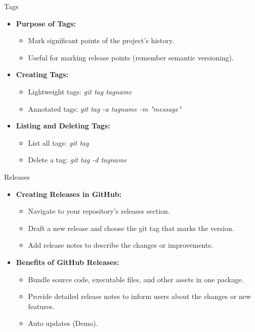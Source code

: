\documentclass[aspectratio=169]{beamer}
\begin{document}
\begin{frame}{Tags}
\begin{itemize}
    \item \textbf{Purpose of Tags:}
    \begin{itemize}
        \item Mark significant points of the project's history.
        \item Useful for marking release points (remember semantic versioning).
    \end{itemize}
    \item \textbf{Creating Tags:}
    \begin{itemize}
        \item Lightweight tags: \textit{git tag tagname}
        \item Annotated tags: \textit{git tag -a tagname -m "message"}
    \end{itemize}
    \item \textbf{Listing and Deleting Tags:}
    \begin{itemize}
        \item List all tags: \textit{git tag}
        \item Delete a tag: \textit{git tag -d tagname}
    \end{itemize}
\end{itemize}
\end{frame}
\begin{frame}{Releases}
\begin{itemize}
    \item \textbf{Creating Releases in GitHub:}
    \begin{itemize}
        \item Navigate to your repository's releases section.
        \item Draft a new release and choose the git tag that marks the version.
        \item Add release notes to describe the changes or improvements.
    \end{itemize}
    \item \textbf{Benefits of GitHub Releases:}
    \begin{itemize}
        \item Bundle source code, executable files, and other assets in one package.
        \item Provide detailed release notes to inform users about the changes or new features.
        \item Auto updates (Demo).
    \end{itemize}
\end{itemize}
\end{frame}
\end{document}
